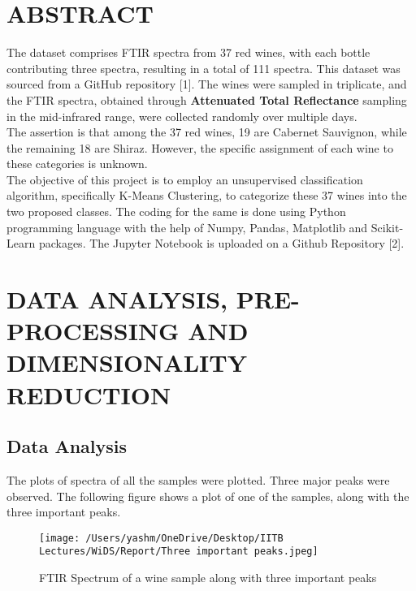 \documentclass{article}
\begin{document}
\section{ABSTRACT}\label{sec:abstract}
The dataset comprises FTIR spectra from 37 red wines, with each bottle contributing three spectra, resulting in a total of 111 spectra. This dataset was sourced from a GitHub repository [1]. The wines were sampled in triplicate, and the FTIR spectra, obtained through \textbf{Attenuated Total Reflectance} sampling in the mid-infrared range, were collected randomly over multiple days.\\
\newline
The assertion is that among the 37 red wines, 19 are Cabernet Sauvignon, while the remaining 18 are Shiraz. However, the specific assignment of each wine to these categories is unknown.\\
\newline
The objective of this project is to employ an unsupervised classification algorithm, specifically K-Means Clustering, to categorize these 37 wines into the two proposed classes. The coding for the same is done using Python programming language with the help of Numpy, Pandas, Matplotlib and Scikit-Learn packages. The Jupyter Notebook is uploaded on a Github Repository [2].\\


\newpage

\section{DATA ANALYSIS, PRE-PROCESSING AND DIMENSIONALITY REDUCTION}
\subsection{Data Analysis}
The plots of spectra of all the samples were plotted. Three major peaks were observed. The following figure shows a plot of one of the samples, along with the three important peaks.

\begin{figure}[H]
	\centering 
	\texttt{[image: /Users/yashm/OneDrive/Desktop/IITB Lectures/WiDS/Report/Three important peaks.jpeg]}
	\caption[Optional Caption]{FTIR Spectrum of a wine sample along with three important peaks}
	\label{fig:fig1}
\end{figure}
\end{document}
